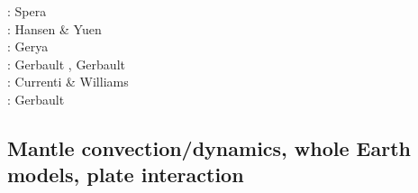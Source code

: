 \begin{scriptsize}
\nineteeneightytwo: Spera \etal \cite{spyk82}\\
\nineteeneightyseven: Hansen \& Yuen \cite{hayu87}\\
\twothousandfour: Gerya \etal \cite{geys04}\\
\twothousandtwelve: Gerbault \cite{gerb12}, Gerbault \etal \cite{gech12}\\
\twothousandfourteen: Currenti \& Williams \cite{cuwi14}\\
\twothousandeighteen: Gerbault \etal \cite{gehn18}
\end{scriptsize}

\subsection{Mantle convection/dynamics, whole Earth models, plate interaction}

